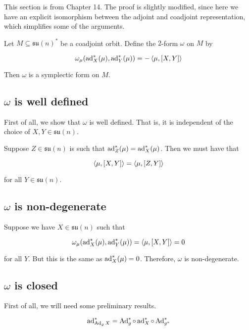 \documentclass{article}
\newcommand{\su}{\mathfrak{su}}
\begin{document}
\label{sec:kks}

This section is from \cite{marsden_ratiu} Chapter 14. The proof is slightly modified, since here we have an explicit isomorphism between the adjoint and coadjoint representation, which simplifies some of the arguments.

\begin{theorem}
    
    Let \(M \subseteq \su(n)^*\) be a coadjoint orbit. Define the \(2\)-form \(\omega\) on \( M\) by

    \[\omega_\mu(\operatorname{ad}_X^*(\mu), \operatorname{ad}_Y^*(\mu)) = -\left\langle \mu, [X, Y] \right\rangle\]

    Then \(\omega\) is a symplectic form on \(M\).

    \label{thm:kks}
\end{theorem}

\subsection{\(\omega\) is well defined}

First of all, we show that \(\omega\) is well defined. That is, it is independent of the choice of \(X, Y \in \su(n)\).

Suppose \(Z \in \su(n)\) is such that \(\operatorname{ad}_Z^*(\mu) = \operatorname{ad}_X^*(\mu)\). Then we must have that

\[\left\langle \mu, [X, Y] \right\rangle = \left\langle \mu, [Z, Y] \right\rangle\]

for all \(Y \in \su(n)\).

\subsection{\(\omega\) is non-degenerate}

Suppose we have \(X \in \su(n)\) such that

\[\omega_\mu(\operatorname{ad}_X^*(\mu), \operatorname{ad}_Y^*(\mu)) = \left\langle \mu, [X, Y] \right\rangle = 0\]

for all \(Y\). But this is the same as \(\operatorname{ad}_X^*(\mu) = 0\). Therefore, \(\omega\) is non-degenerate.

\subsection{\(\omega\) is closed}

First of all, we will need some preliminary results.

\begin{lemma}
    \[\operatorname{ad}_{\operatorname{Ad}_gX}^* = \operatorname{Ad}_g^* \circ \operatorname{ad}_X^* \circ \operatorname{Ad}_{g^*}^*\]
    \label{lem:ad_Ad}
\end{lemma}
\end{document}
